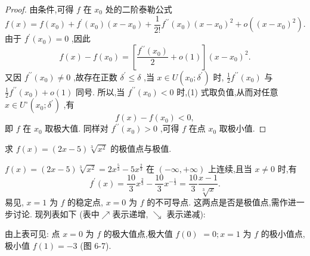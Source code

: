 \begin{proof}
由条件,可得 \(f\) 在 \({x}_{0}\) 处的二阶泰勒公式
\[
f\left( x\right)  = f\left( {x}_{0}\right)  + {f}^{\prime }\left( {x}_{0}\right) \left( {x - {x}_{0}}\right)  + \frac{1}{2!}{f}^{\prime \prime }\left( {x}_{0}\right) {\left( x - {x}_{0}\right) }^{2} + o\left( {\left( x - {x}_{0}\right) }^{2}\right) .
\]
由于 \({f}^{\prime }\left( {x}_{0}\right)  = 0\) ,因此
\[
f\left( x\right)  - f\left( {x}_{0}\right)  = \left\lbrack  {\frac{{f}^{\prime \prime }\left( {x}_{0}\right) }{2} + o\left( 1\right) }\right\rbrack  {\left( x - {x}_{0}\right) }^{2}. \tag{1}
\]
又因 \({f}^{\prime \prime }\left( {x}_{0}\right)  \neq  0\) ,故存在正数 \({\delta }^{\prime } \leq  \delta\) ,当 \(x \in  U\left( {{x}_{0};{\delta }^{\prime }}\right)\) 时, \(\frac{1}{2}{f}^{\prime \prime }\left( {x}_{0}\right)\) 与 \(\frac{1}{2}{f}^{\prime \prime }\left( {x}_{0}\right)  + o\left( 1\right)\) 同号. 所以,当 \({f}^{\prime \prime }\left( {x}_{0}\right)  < 0\) 时,(1) 式取负值,从而对任意 \(x \in  {U}^{ \circ  }\left( {{x}_{0};{\delta }^{\prime }}\right)\) ,有
\[
f\left( x\right)  - f\left( {x}_{0}\right)  < 0,
\]
即 \(f\) 在 \({x}_{0}\) 取极大值. 同样对 \({f}^{\prime \prime }\left( {x}_{0}\right)  > 0\) ,可得 \(f\) 在点 \({x}_{0}\) 取极小值.
\end{proof}


\begin{example}
求 \(f\left( x\right)  = \left( {{2x} - 5}\right) \sqrt[3]{{x}^{2}}\) 的极值点与极值.
\end{example}


\begin{solution}
\(f\left( x\right)  = \left( {{2x} - 5}\right) \sqrt[3]{{x}^{2}} = 2{x}^{\frac{5}{3}} - 5{x}^{\frac{2}{3}}\) 在 \(\left( {-\infty , + \infty }\right)\) 上连续,且当 \(x \neq  0\) 时,有
\[
{f}^{\prime }\left( x\right)  = \frac{10}{3}{x}^{\frac{2}{3}} - \frac{10}{3}{x}^{-\frac{1}{3}} = \frac{10}{3}\frac{x - 1}{\sqrt[3]{x}}.
\]
易见, \(x = 1\) 为 \(f\) 的稳定点, \(x = 0\) 为 \(f\) 的不可导点. 这两点是否是极值点,需作进一步讨论. 现列表如下 (表中\(\nearrow\)表示递增, \(\searrow\) 表示递减):

\begin{center}
\end{center}

由上表可见: 点 \(x = 0\) 为 \(f\) 的极大值点,极大值 \(f\left( 0\right)\)  \(= 0;x = 1\) 为 \(f\) 的极小值点,极小值 \(f\left( 1\right)  =  - 3\) (图 6-7).
\end{solution}


